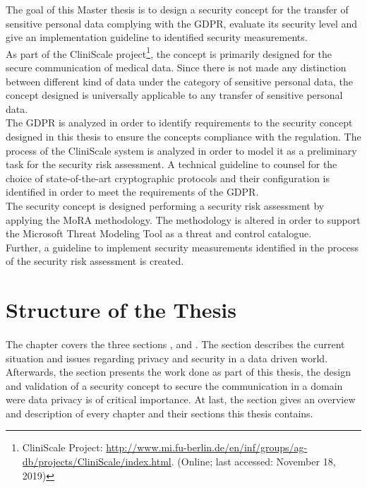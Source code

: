 The goal of this Master thesis is to design a security concept for the transfer of sensitive personal data complying with the GDPR, evaluate its security level and give an implementation guideline to identified security measurements.\\
\newline
As part of the CliniScale project\footnote{CliniScale Project: \url{http://www.mi.fu-berlin.de/en/inf/groups/ag-db/projects/CliniScale/index.html}. (Online; last accessed:  November 18, 2019)}, the concept is primarily designed for the secure communication of medical data. Since there is not made any distinction between different kind of data under the category of sensitive personal data, the concept designed is universally applicable to any transfer of sensitive personal data.\\
\newline
The GDPR is analyzed in order to identify requirements to the security concept designed in this thesis to ensure the concepts compliance with the regulation. The process of the CliniScale system is analyzed in order to model it as a preliminary task for the security risk assessment. A technical guideline to counsel for the choice of state-of-the-art cryptographic protocols and their configuration is identified in order to meet the requirements of the GDPR.\\
\newline
The security concept is designed performing a security risk assessment by applying the MoRA methodology. The methodology is altered in order to support the Microsoft Threat Modeling Tool as a threat and control catalogue. \\
\newline
Further, a guideline to implement security measurements identified in the process of the security risk assessment is created.

\section{Structure of the Thesis}
\label{structure}

\paragraph{} The chapter \textit{} covers the three sections \textit{}, \textit{} and \textit{}. The section \textit{} describes the current situation and issues regarding privacy and security in a data driven world. Afterwards, the section \textit{} presents the work done as part of this thesis, the design and validation of a security concept to secure the communication in a domain were data privacy is of critical importance. At last, the section \textit{} gives an overview and description of every chapter and their sections this thesis contains.


